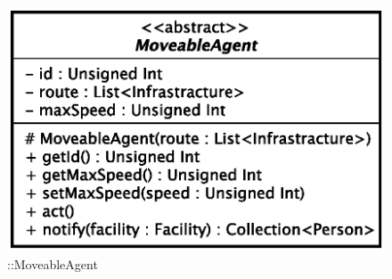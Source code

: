 \begin{figure}[h]
\centering
\includegraphics[scale=0.6,keepaspectratio]{images/solution/app/backend/moveable_agent.eps}
\caption{\pActive::MoveableAgent}
\label{fig:sd-app-moveable-agent}
\end{figure}
\FloatBarrier
